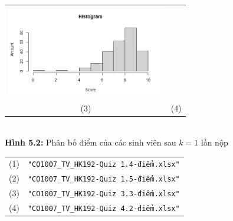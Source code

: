 \documentclass[a4paper]{article}
\theoremstyle{definition}
\begin{document}
\begin{enumerate}[a)]
\begin{itemize}
\begin{center}
\begin{tabular}{c c}
                 \includegraphics[width = 6.9cm]{Images/img5-2-4.png} \\
                 (3) & (4)
            \end{tabular}\\
            \textbf{Hình 5.2:} Phân bố điểm của các sinh viên sau $k=1$ lần nộp\\
            \begin{tabular}{c c}
                 (1) & \texttt{"CO1007\_TV\_HK192-Quiz 1.4-điểm.xlsx"}\\
                 (2) & \texttt{"CO1007\_TV\_HK192-Quiz 1.5-điểm.xlsx"}\\
                 (3) & \texttt{"CO1007\_TV\_HK192-Quiz 3.3-điểm.xlsx"}\\
                 (4) & \texttt{"CO1007\_TV\_HK192-Quiz 4.2-điểm.xlsx"}
            \end{tabular}
        \end{center}
    \end{itemize}
    

\end{enumerate}
\end{document}
